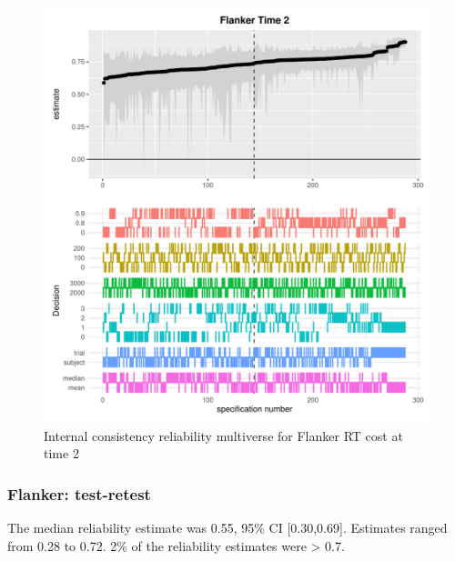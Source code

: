 \documentclass[
  english,
  man,floatsintext]{apa6}
\begin{document}
\begin{figure}
\centering
\includegraphics{Reliability_Multiverse_files/figure-latex/unnamed-chunk-9-1.pdf}
\caption{\label{fig:unnamed-chunk-9}Internal consistency reliability multiverse for Flanker RT cost at time 2}
\end{figure}

\newpage

\hypertarget{flanker-test-retest}{%
\subsubsection{Flanker: test-retest}\label{flanker-test-retest}}

The median reliability estimate was 0.55, 95\% CI {[}0.30,0.69{]}. Estimates ranged from 0.28 to 0.72. 2\% of the reliability estimates were \textgreater{} 0.7.
\end{document}
